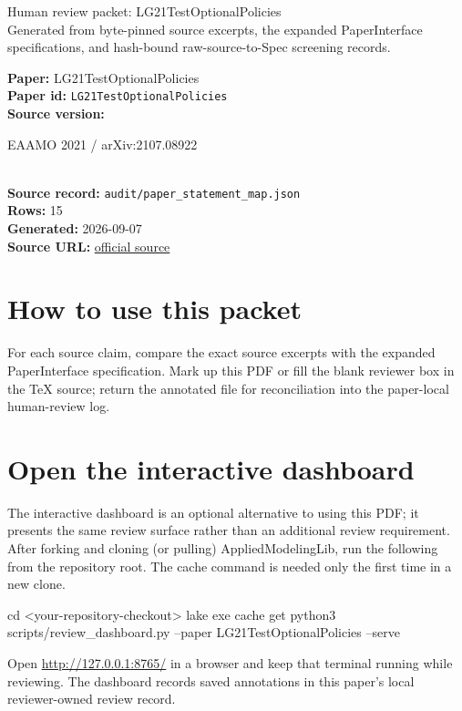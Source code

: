 \documentclass[10pt]{article}
\begin{document}
\fontsize{9}{10}\selectfont

\begin{center}
{\LARGE Human review packet: LG21TestOptionalPolicies}\\[0.35em]
\small Generated from byte-pinned source excerpts, the expanded PaperInterface
specifications, and hash-bound raw-source-to-Spec screening records.
\end{center}

\noindent\textbf{Paper:} LG21TestOptionalPolicies\\
\textbf{Paper id:} \texttt{LG21TestOptionalPolicies}\\
\textbf{Source version:} \parbox[t]{0.76\linewidth}{\raggedright EAAMO 2021 / arXiv:2107.08922}\\
\textbf{Source record:} \texttt{audit/paper\_statement\_map.json}\\
\textbf{Rows:} 15\\
\textbf{Generated:} 2026-09-07\\
\textbf{Source URL:} \href{https://arxiv.org/abs/2107.08922}{official source}





\section*{How to use this packet}
For each source claim, compare the exact source excerpts with the expanded
PaperInterface specification. Mark up this PDF or fill the blank reviewer box in the TeX source;
return the annotated file for reconciliation into the paper-local human-review
log.

\section*{Open the interactive dashboard}
The interactive dashboard is an optional alternative to using this PDF; it
presents the same review surface rather than an additional review requirement.
After forking and cloning (or pulling) AppliedModelingLib, run the following from the
repository root. The cache command is needed only the first time in a new clone.
\begin{ReviewVerbatim}
cd <your-repository-checkout>
lake exe cache get
python3 scripts/review_dashboard.py --paper LG21TestOptionalPolicies --serve
\end{ReviewVerbatim}
Open \url{http://127.0.0.1:8765/} in a browser and keep that terminal running
while reviewing. The dashboard records saved annotations in this paper's local
reviewer-owned review record.
\end{document}
